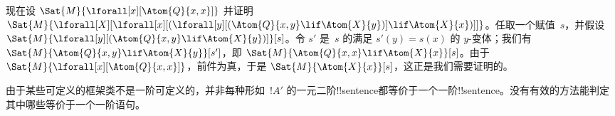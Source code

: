 \documentclass[../../../include/open-logic-section]{subfiles}
\begin{document}
现在设 $\Sat{M}{\lforall[x][\Atom{Q}{x,x}]}$ 并证明 $\Sat{M}{\lforall[X][\lforall[x][(\lforall[y][(\Atom{Q}{x,y} \lif
        \Atom{X}{y})] \lif \Atom{X}{x})]]}$。任取一个赋值~$s$，并假设 $\Sat{M}{\lforall[y][(\Atom{Q}{x,y} \lif
    \Atom{X}{y})]}[s]$。令 $s'$ 是~$s$ 的满足 $s'(y) = s(x)$ 的 $y$-变体；我们有 $\Sat{M}{\Atom{Q}{x,y} \lif \Atom{X}{y}}[s']$，即 $\Sat{M}{\Atom{Q}{x,x} \lif \Atom{X}{x}}[s]$。由于 $\Sat{M}{\lforall[x][\Atom{Q}{x,x}]}$，前件为真，于是 $\Sat{M}{\Atom{X}{x}}[s]$，这正是我们需要证明的。

由于某些可定义的框架类不是一阶可定义的，并非每种形如~$!A'$ 的一元二阶!!{sentence}都等价于一个一阶!!{sentence}。没有有效的方法能判定其中哪些等价于一个一阶语句。
\end{document}
